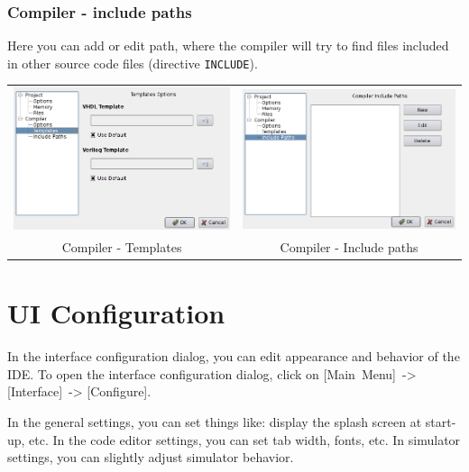         \subsubsection{Compiler - include paths}
            Here you can add or edit path, where the compiler will try to find files included in other source code files
            (directive \texttt{INCLUDE}).

            \begin{table}[h!]
                \begin{tabular}{cc}
                    \includegraphics[width=.5\textwidth]{img/config5.png}
                        &
                    \includegraphics[width=.5\textwidth]{img/config6.png}
                        \\
                    Compiler - Templates & Compiler - Include paths
                \end{tabular}
                \end{table}

\clearpage
\section{UI Configuration}
    In the interface configuration dialog, you can edit appearance and behavior of the IDE. To open the interface configuration dialog, click on [Main~Menu]~-> [Interface]~-> [Configure].

    In the general settings, you can set things like: display the splash screen at start-up, etc. In the code editor settings, you can set tab width, fonts, etc. In simulator settings, you can slightly adjust simulator behavior.

